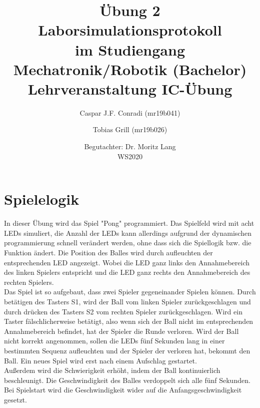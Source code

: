 \documentclass[a4paper]{article}
\title{{\huge Übung 2}\\Laborsimulationsprotokoll\\ \large im Studiengang Mechatronik/Robotik (Bachelor) Lehrveranstaltung IC-Übung}
\date{Begutachter: Dr. Moritz Lang \\ WS2020}
\author{Caspar J.F. Conradi (mr19b041) \and Tobias Grill (mr19b026)}
\begin{document}
    \maketitle
    \newpage

    \tableofcontents
    \newpage

    \section{Spielelogik}
     In dieser Übung wird das Spiel "Pong" programmiert. Das Spielfeld wird mit acht LEDs simuliert, die Anzahl der LEDs kann allerdings aufgrund der dynamischen programmierung schnell verändert werden, ohne dass sich die Spiellogik bzw. die Funktion ändert. Die Position des Balles wird durch aufleuchten der entsprechenden LED angezeigt. Wobei die LED ganz links den Annahmebereich des linken Spielers entspricht und die LED ganz rechts den Annahmebereich des rechten Spielers.\\
     Das Spiel ist so aufgebaut, dass zwei Spieler gegeneinander Spielen können. Durch betätigen des Tasters S1, wird der Ball vom linken Spieler zurückgeschlagen und durch drücken des Tasters S2 vom rechten Spieler zurückgeschlagen. Wird ein Taster fälschlicherweise betätigt, also wenn sich der Ball nicht im entsprechenden Annahmebereich befindet, hat der Spieler die Runde verloren. Wird der Ball nicht korrekt angenommen, sollen die LEDs fünf Sekunden lang in einer bestimmten Sequenz aufleuchten und der Spieler der verloren hat, bekommt den Ball. Ein neues Spiel wird erst nach einem Aufschlag gestartet.\\
     Außerdem wird die Schwierigkeit erhöht, indem der Ball kontinuierlich beschleunigt. Die Geschwindigkeit des Balles verdoppelt sich alle fünf Sekunden. Bei Spielstart wird die Geschwindigkeit wider auf die Anfangsgeschwindigkeit gesetzt.
\end{document}

